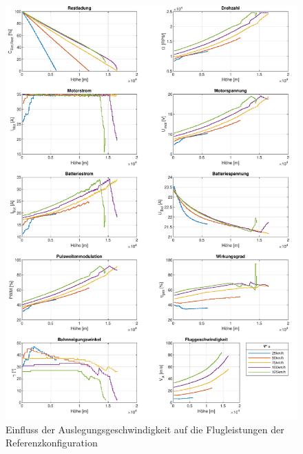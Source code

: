 \begin{figure}[H]
\centering
	\includegraphics[scale=0.7]{Diagramme/Flaechenflzg_Vstern.pdf}
	\caption{Einfluss der Auslegungsgeschwindigkeit auf die Flugleistungen der Referenzkonfiguration}
	\label{abb:vstern}
\end{figure}



